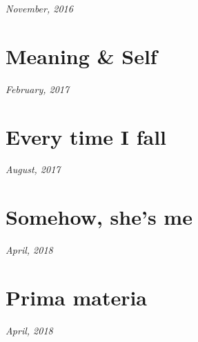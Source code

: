 \documentclass[10pt]{memoir}
\begin{document}
  \hfill\textit{November, 2016}

  
  \cleartoverso


  \section{Meaning \& Self}

  \hfill\textit{February, 2017}

  
  \newpage

  \section{Every time I fall}

  \hfill\textit{August, 2017}

  
  \newpage


  \section{Somehow, she's me}

  \hfill\textit{April, 2018}

  
  \newpage


  \section{Prima materia}

  \hfill\textit{April, 2018}

  
\end{document}
